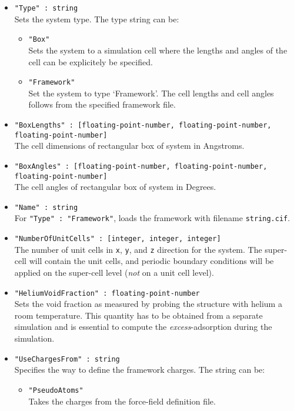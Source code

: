 \begin{itemize}
\item{\verb+"Type" : string+}\\
Sets the system type. The type string can be:
  \begin{itemize}
  \item{\verb+"Box"+}\\
    Sets the system to a simulation cell where the lengths and angles of the cell can be explicitely be specified.
  \item{\verb+"Framework"+}\\
    Set the system to type `Framework'. The cell lengths and cell angles follows from the specified framework file.
  \end{itemize}
\item{\verb+"BoxLengths" : [floating-point-number, floating-point-number, floating-point-number]+}\\
The cell dimensions of rectangular box of system in Angstroms.
\item{\verb+"BoxAngles" : [floating-point-number, floating-point-number, floating-point-number]+}\\
The cell angles of rectangular box of system in Degrees.
\item{\verb+"Name" : string+}\\
For \verb+"Type" : "Framework"+, loads the framework with filename \verb+string.cif+.
\item{\verb+"NumberOfUnitCells" : [integer, integer, integer]+}\\
The number of unit cells in \verb+x+, \verb+y+, and \verb+z+ direction for the system. 
The super-cell will contain the unit cells, and periodic boundary conditions
will be applied on the super-cell level (\emph{not} on a unit cell level).
\item{\verb+"HeliumVoidFraction" : floating-point-number+}\\
Sets the void fraction as measured by probing the structure with helium a room temperature. 
This quantity has to be obtained from a separate simulation 
and is essential to compute the \emph{excess}-adsorption during the simulation.
\item{\verb+"UseChargesFrom" : string+}\\
Specifies the way to define the framework charges.
The string can be:
  \begin{itemize}
  \item{\verb+"PseudoAtoms"+}\\
  Takes the charges from the force-field definition file.

\end{itemize}
\end{itemize}
